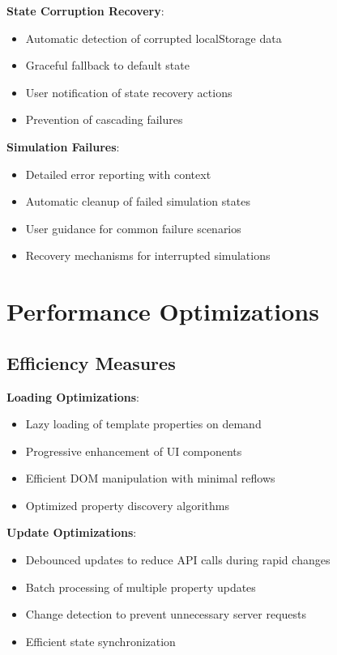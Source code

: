 \documentclass[12pt,a4paper]{article}
\begin{document}
\textbf{State Corruption Recovery}:
\begin{itemize}
    \item Automatic detection of corrupted localStorage data
    \item Graceful fallback to default state
    \item User notification of state recovery actions
    \item Prevention of cascading failures
\end{itemize}

\textbf{Simulation Failures}:
\begin{itemize}
    \item Detailed error reporting with context
    \item Automatic cleanup of failed simulation states
    \item User guidance for common failure scenarios
    \item Recovery mechanisms for interrupted simulations
\end{itemize}

\section{Performance Optimizations}

\subsection{Efficiency Measures}

\textbf{Loading Optimizations}:
\begin{itemize}
    \item Lazy loading of template properties on demand
    \item Progressive enhancement of UI components
    \item Efficient DOM manipulation with minimal reflows
    \item Optimized property discovery algorithms
\end{itemize}

\textbf{Update Optimizations}:
\begin{itemize}
    \item Debounced updates to reduce API calls during rapid changes
    \item Batch processing of multiple property updates
    \item Change detection to prevent unnecessary server requests
    \item Efficient state synchronization
\end{itemize}
\end{document}
